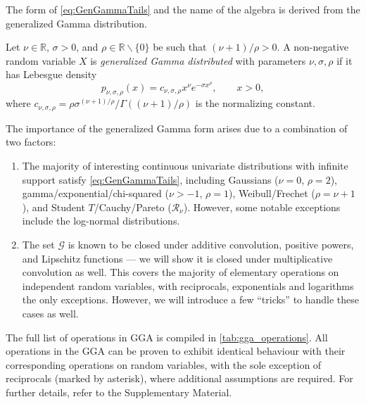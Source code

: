 The form of \cref{eq:GenGammaTails} and the name of the algebra is derived from the generalized Gamma distribution. 
\begin{definition}
Let $\nu \in \mathbb{R}$, $\sigma > 0$, and $\rho \in \mathbb{R} \backslash \{0\}$ be such that $(\nu+1)/ \rho > 0$.
A non-negative random variable $X$ is \emph{generalized Gamma distributed} with parameters $\nu,\sigma,\rho$ if it has Lebesgue density
\begin{equation}
\label{eq:GenGammaDensity}
p_{\nu,\sigma,\rho}(x) = c_{\nu,\sigma,\rho} x^\nu e^{-\sigma x^\rho},\qquad x > 0,
\end{equation}
where $c_{\nu,\sigma,\rho} = \rho \sigma^{(\nu+1)/\rho} / \Gamma((\nu+1)/\rho)$ is the normalizing constant. %
\end{definition}
The importance of the generalized Gamma form arises due to a combination of two factors:
\begin{enumerate}[label={(\roman*)},leftmargin=*]
    \item The majority of interesting continuous univariate distributions with infinite support satisfy \cref{eq:GenGammaTails}, including
    Gaussians ($\nu=0$, $\rho=2$),
    gamma/exponential/chi-squared ($\nu > -1$, $\rho=1$), Weibull/Frechet ($\rho = \nu + 1$), and
    Student $T$/Cauchy/Pareto ($\mathcal{R}_\nu$).
    However, some notable exceptions include the log-normal distributions. 
    \item The set $\mathcal{G}$ is known to be closed under additive convolution, positive powers, and Lipschitz functions --- we will show it is closed under multiplicative convolution as well. This covers the majority of elementary operations on independent random variables, with reciprocals, exponentials and logarithms the only exceptions. However, we will introduce a few ``tricks'' to handle these cases as well. 
\end{enumerate}
The full list of operations in GGA is compiled in \cref{tab:gga_operations}. All operations in the GGA can be proven to exhibit identical behaviour with their corresponding operations on random variables, with the sole exception of reciprocals (marked by asterisk), where additional assumptions are required. For further details, refer to the Supplementary Material.


